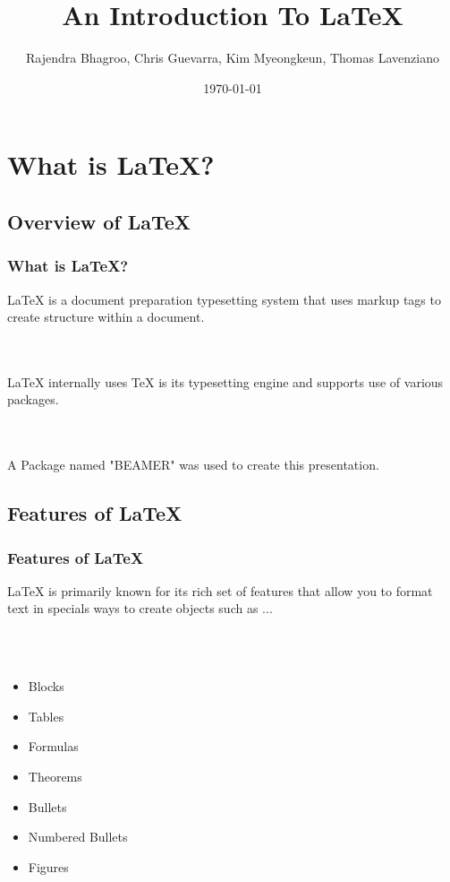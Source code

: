 \documentclass{beamer}
\title[LaTeX]{An Introduction To LaTeX}
\author[Programming Language Concepts - CSCI 318]{Rajendra Bhagroo, Chris Guevarra, Kim Myeongkeun, Thomas Lavenziano}
\institute[NYIT]
{
New York Institute of Technology \\
\medskip
}
\date{\today}
\begin{document}
\begin{frame}
\titlepage
\end{frame}


\section{What is LaTeX?}

\subsection{Overview of LaTeX}

\begin{frame}
\frametitle{What is LaTeX?}

LaTeX is a document preparation typesetting system that uses markup tags to create structure within a document.

\\~\\

LaTeX internally uses TeX is its typesetting engine and supports use of various packages.

\\~\\

A Package named "BEAMER" was used to create this presentation.

\end{frame}


\subsection{Features of LaTeX}

\begin{frame}
\frametitle{Features of LaTeX}

LaTeX is primarily known for its rich set of features that allow you to format text in specials ways to create objects such as ...

\\~\\

\begin{itemize}
\item Blocks
\item Tables
\item Formulas
\item Theorems
\item Bullets
\item Numbered Bullets
\item Figures
\end{itemize}

\end{frame}
\end{document}
